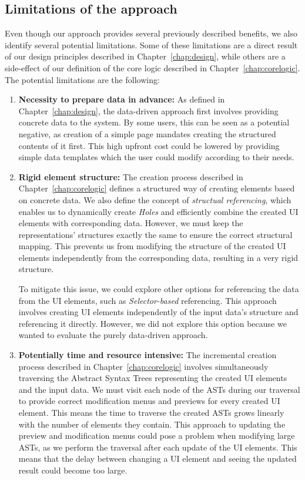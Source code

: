 \subsection{Limitations of the approach}
Even though our approach provides several previously described benefits, we also identify several potential limitations.
Some of these limitations are a direct result of our design principles described in Chapter~\ref{chap:design}, while others are
a side-effect of our definition of the core logic described in Chapter~\ref{chap:corelogic}.
The potential limitations are the following:
\begin{enumerate}
	\item \textbf{Necessity to prepare data in advance:} As defined in Chapter~\ref{chap:design}, the data-driven approach first involves providing concrete data to the system.
	      By some users, this can be seen as a potential negative, as creation of a simple page mandates creating the structured contents of it first.
	      This high upfront cost could be lowered by providing simple data templates which the user could modify according to their needs.

	\item \textbf{Rigid element structure:} The creation process described in Chapter~\ref{chap:corelogic} defines a structured way
	      of creating elements based on concrete data.
	      We also define the concept of \emph{structual referencing}, which enables us to dynamically create \emph{Holes} and efficiently combine the created UI elements with corresponding data.
	      However, we must keep the representations' structures exactly the same to ensure the correct structural mapping.
	      This prevents us from modifying the structure of the created UI elements independently from the corresponding data, resulting in a very rigid structure.

	      To mitigate this issue, we could explore other options for referencing the data from the UI elements, such as \emph{Selector-based} referencing.
	      This approach involves creating UI elements independently of the input data's structure and referencing it directly.
	      However, we did not explore this option because we wanted to evaluate the purely data-driven approach.

	\item \textbf{Potentially time and resource intensive:} The incremental creation process described in Chapter~\ref{chap:corelogic} involves simultaneously traversing the Abstract Syntax Trees representing the created UI elements and the input data.
	      We must visit each node of the ASTs during our traversal to provide correct modification menus and previews for every created UI element.
	      This means the time to traverse the created ASTs grows linearly with the number of elements they contain.
	      This approach to updating the preview and modification menus could pose a problem when modifying large ASTs, as we perform the traversal after each update of the UI elements.
	      This means that the delay between changing a UI element and seeing the updated result could become too large.


\end{enumerate}
